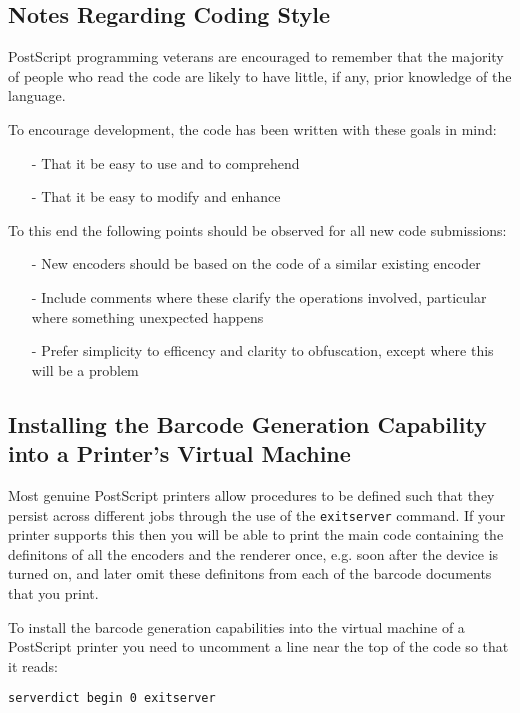 \documentclass[11pt,english,BCOR10mm,DIV12,bibliography=totoc,parskip=false,smallheadings
    headexclude,footexclude,oneside]{pst-doc}
\begin{document}
\subsection{Notes Regarding Coding Style}

PostScript programming veterans are encouraged to remember that the
majority of people who read the code are likely to have little,
if any, prior knowledge of the language.

To encourage development, the code has been written with these
goals in mind:

\begin{itemize}
\item[-]{That it be easy to use and to comprehend}
\item[-]{That it be easy to modify and enhance}
\end{itemize}

To this end the following points should be observed for all new
code submissions:

\begin{itemize}
\item[-]{New encoders should be based on the code of a similar
existing encoder}
\item[-]{Include comments where these clarify the operations 
involved, particular where something unexpected happens}
\item[-]{Prefer simplicity to efficency and clarity to
obfuscation, except where this will be a problem}
\end{itemize}

\subsection{Installing the Barcode Generation Capability into a Printer's Virtual Machine}

Most genuine PostScript printers allow procedures to be defined such 
that they persist across different jobs through the use of the \texttt{exitserver}
command. If your printer supports this then you will be able to print
the main code containing the definitons of all the encoders and the
renderer once, e.g. soon after the device is turned on, and later omit
these definitons from each of the barcode documents that you print.

To install the barcode generation capabilities into the 
virtual machine of a PostScript printer you need to uncomment a line near the
top of the code so that it reads:

\begin{lstlisting}
serverdict begin 0 exitserver
\end{lstlisting}
\end{document}

